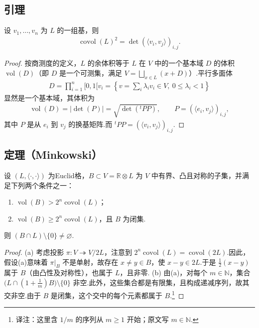 \subsection{引理}\label{sec:nt-5-1-2}
设 $v_1,\ldots,v_n$ 为 $L$ 的一组基，则
\begin{align*}
\operatorname{covol}(L)^2=\det(\langle v_i,v_j\rangle)_{i,j}.
\end{align*}
\begin{proof}
按商测度的定义，$L$ 的余体积等于 $L$ 在 $V$ 中的一个基本域 $D$ 的体积 $\operatorname{vol}(D)$（即 $D$ 是一个可测集，满足 $V=\bigsqcup_{x\in L}(x+D)$）.平行多面体
\begin{align*}
D=\prod_{i=1}^n[0,1[v_i=\left\{v=\sum_i\lambda_iv_i\in V,\ 0\le\lambda_i<1\right\}
\end{align*}
显然是一个基本域，其体积为
\begin{align*}
\operatorname{vol}(D)=|\det(P)|=\sqrt{\det({}^tPP)},\qquad P=(\langle e_i,v_j\rangle)_{i,j},
\end{align*}
其中 $P$ 是从 $e_i$ 到 $v_j$ 的换基矩阵.而 ${}^tPP=(\langle v_i,v_j\rangle)_{i,j}$.
\end{proof}
\subsection{定理（Minkowski）}\label{sec:nt-5-1-3}
设 $(L,\langle\cdot,\cdot\rangle)$ 为Euclid格，$B\subset V=\mathbb R\otimes L$ 为 $V$ 中有界、凸且对称的子集，并满足下列两个条件之一：
\begin{enumerate}[label=(\alph*)]
\item $\operatorname{vol}(B)>2^n\operatorname{covol}(L)$；
\item $\operatorname{vol}(B)\ge2^n\operatorname{covol}(L)$，且 $B$ 为闭集.
\end{enumerate}
则 $(B\cap L)\setminus\{0\}\ne\varnothing$.
\begin{proof}
\textup{(a)} 考虑投影 $\pi\colon V\twoheadrightarrow V/2L$，注意到 $2^n\operatorname{covol}(L)=\operatorname{covol}(2L)$.因此，假设(a)意味着 $\pi|_B$ 不是单射，故存在 $x\ne y\in B$，使 $x-y\in2L$.于是 $\frac12(x-y)$ 属于 $B$（由凸性及对称性），也属于 $L$，且非零.
\textup{(b)} 由(a)，对每个 $m\in\mathbb N$，集合 $\bigl(L\cap(1+\frac1m)B\bigr)\setminus\{0\}$ 非空.此外，这些集合都是有限集，且构成递减序列，故其交非空.由于 $B$ 是闭集，这个交中的每个元素都属于 $B$.\footnote{译注：这里含 $1/m$ 的序列从 $m\ge1$ 开始；原文写 $m\in\mathbb N$.}
\end{proof}
